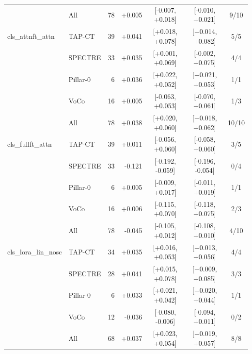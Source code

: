 \begin{tabular}{@{}llrrccc@{}}
 & All & 78 & +0.005 & [-0.007, +0.018] & [-0.010, +0.021] & 9/10 \\
\addlinespace[2pt]
cls\_attnft\_attn & TAP-CT & 39 & +0.041 & [+0.018, +0.078] & [+0.014, +0.082] & 5/5 \\
 & SPECTRE & 33 & +0.035 & [+0.001, +0.069] & [-0.002, +0.075] & 4/4 \\
 & Pillar-0 & 6 & +0.036 & [+0.022, +0.052] & [+0.021, +0.053] & 1/1 \\
 & VoCo & 16 & +0.005 & [-0.063, +0.053] & [-0.070, +0.061] & 1/3 \\
 & All & 78 & +0.038 & [+0.020, +0.060] & [+0.018, +0.062] & 10/10 \\
\addlinespace[2pt]
cls\_fullft\_attn & TAP-CT & 39 & +0.011 & [-0.056, +0.060] & [-0.058, +0.060] & 3/5 \\
 & SPECTRE & 33 & -0.121 & [-0.192, -0.059] & [-0.196, -0.054] & 0/4 \\
 & Pillar-0 & 6 & +0.005 & [-0.009, +0.017] & [-0.011, +0.019] & 1/1 \\
 & VoCo & 16 & +0.006 & [-0.115, +0.070] & [-0.118, +0.075] & 2/3 \\
 & All & 78 & -0.045 & [-0.105, +0.012] & [-0.108, +0.010] & 4/10 \\
\addlinespace[2pt]
cls\_lora\_lin\_nosc & TAP-CT & 34 & +0.035 & [+0.016, +0.053] & [+0.013, +0.056] & 4/4 \\
 & SPECTRE & 28 & +0.041 & [+0.015, +0.078] & [+0.009, +0.085] & 3/3 \\
 & Pillar-0 & 6 & +0.033 & [+0.021, +0.042] & [+0.020, +0.044] & 1/1 \\
 & VoCo & 12 & -0.036 & [-0.080, -0.006] & [-0.094, +0.011] & 0/2 \\
 & All & 68 & +0.037 & [+0.023, +0.054] & [+0.019, +0.057] & 8/8 \\
\bottomrule
\end{tabular}
